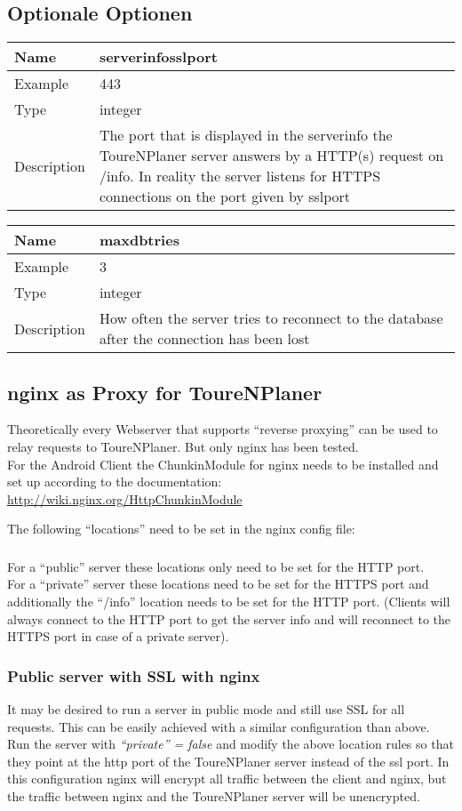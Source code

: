 \documentclass[ngerman,titlepage,parskip=true]{scrartcl}
\newcommand{\configoption}[4]
{%
\setlength{\extrarowheight}{2pt}
\begin{tabular}{|p{0.2\textwidth}|p{0.9\textwidth}|}
\hline
  \textbf{Name} & \textbf{#1}\\\hline
  Example & #2\\\hline
  Type & #3\\\hline
  Description & #4\\\hline
\end{tabular}
}
\begin{document}
\subsection{Optionale Optionen}

\configoption
{serverinfosslport}
{443}
{integer}
{The port that is displayed in the serverinfo the ToureNPlaner server answers by a HTTP(s) request on /info. In reality the server listens for HTTPS connections on the port given by sslport}

\configoption
{maxdbtries}
{3}
{integer}
{How often the server tries to reconnect to the database after the connection has been lost}

\subsection{nginx as Proxy for ToureNPlaner}

Theoretically every Webserver that supports ``reverse proxying'' can be used to relay requests to ToureNPlaner. But only nginx has been tested.\\

For the Android Client the ChunkinModule for nginx needs to be installed and set up according to the documentation:
\url{http://wiki.nginx.org/HttpChunkinModule}

The following ``locations'' need to be set in the nginx config file:



\subsubsection{}
For a ``public'' server these locations only need to be set for the HTTP port.\\
For a ``private'' server these locations need to be set for the HTTPS port and additionally the ``/info'' location needs to be set for the HTTP port. (Clients will always connect to the HTTP port to get the server info and will reconnect to the HTTPS port in case of a private server).

\subsubsection{Public server with SSL with nginx}

It may be desired to run a server in public mode and still use SSL for all requests. This can be easily achieved with a similar configuration than above.\\
Run the server with \textit{``private'' = false} and modify the above location rules so that they point at the http port of the ToureNPlaner server instead of the ssl port.
In this configuration nginx will encrypt all traffic between the client and nginx, but the traffic between nginx and the ToureNPlaner server will be unencrypted.
\end{document}
